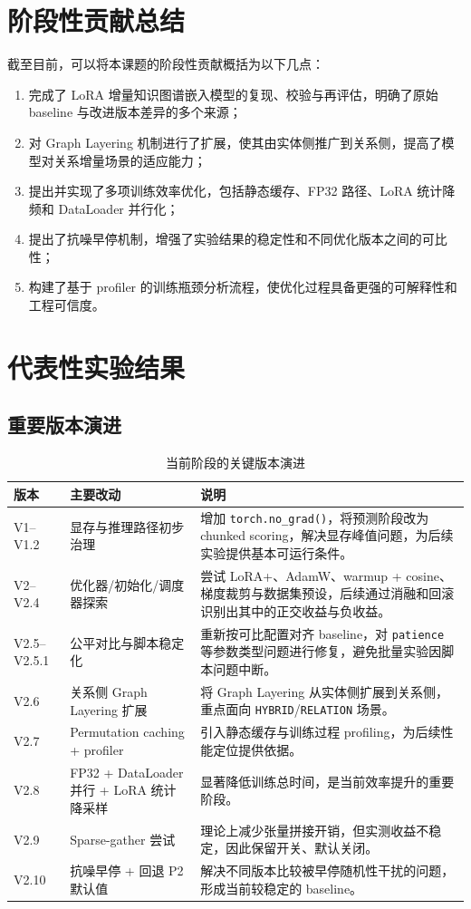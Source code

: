 \documentclass[12pt,a4paper]{ctexart}
\begin{document}
\section{阶段性贡献总结}
截至目前，可以将本课题的阶段性贡献概括为以下几点：
\begin{enumerate}
  \item 完成了 LoRA 增量知识图谱嵌入模型的复现、校验与再评估，明确了原始 baseline 与改进版本差异的多个来源；
  \item 对 Graph Layering 机制进行了扩展，使其由实体侧推广到关系侧，提高了模型对关系增量场景的适应能力；
  \item 提出并实现了多项训练效率优化，包括静态缓存、FP32 路径、LoRA 统计降频和 DataLoader 并行化；
  \item 提出了抗噪早停机制，增强了实验结果的稳定性和不同优化版本之间的可比性；
  \item 构建了基于 profiler 的训练瓶颈分析流程，使优化过程具备更强的可解释性和工程可信度。
\end{enumerate}

\section{代表性实验结果}

\subsection{重要版本演进}
\begin{table}[H]
\centering
\caption{当前阶段的关键版本演进}
\begin{tabularx}{\textwidth}{>{\raggedright\arraybackslash}p{1.8cm} >{\raggedright\arraybackslash}p{3.7cm} X}
\toprule
版本 & 主要改动 & 说明 \\
\midrule
V1--V1.2 & 显存与推理路径初步治理 & 增加 \texttt{torch.no\_grad()}，将预测阶段改为 chunked scoring，解决显存峰值问题，为后续实验提供基本可运行条件。 \\
V2--V2.4 & 优化器/初始化/调度器探索 & 尝试 LoRA+、AdamW、warmup + cosine、梯度裁剪与数据集预设，后续通过消融和回滚识别出其中的正交收益与负收益。 \\
V2.5--V2.5.1 & 公平对比与脚本稳定化 & 重新按可比配置对齐 baseline，对 \texttt{patience} 等参数类型问题进行修复，避免批量实验因脚本问题中断。 \\
V2.6 & 关系侧 Graph Layering 扩展 & 将 Graph Layering 从实体侧扩展到关系侧，重点面向 \texttt{HYBRID}/\texttt{RELATION} 场景。 \\
V2.7 & Permutation caching + profiler & 引入静态缓存与训练过程 profiling，为后续性能定位提供依据。 \\
V2.8 & FP32 + DataLoader 并行 + LoRA 统计降采样 & 显著降低训练总时间，是当前效率提升的重要阶段。 \\
V2.9 & Sparse-gather 尝试 & 理论上减少张量拼接开销，但实测收益不稳定，因此保留开关、默认关闭。 \\
V2.10 & 抗噪早停 + 回退 P2 默认值 & 解决不同版本比较被早停随机性干扰的问题，形成当前较稳定的 baseline。 \\
\bottomrule
\end{tabularx}
\end{table}
\end{document}
